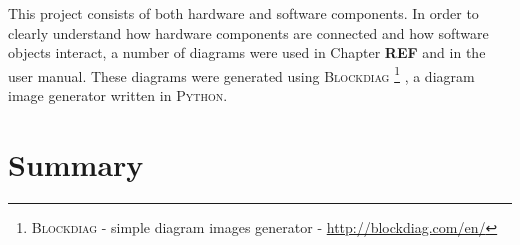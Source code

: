 This project consists of both hardware and software components. In order to clearly understand how hardware components are connected and how software objects interact, a number of diagrams were used in Chapter \textbf{REF} and in the user manual. These diagrams were generated using \textsc{Blockdiag} \footnote{\textsc{Blockdiag} - simple diagram images generator - \url{http://blockdiag.com/en/}} , a diagram image generator written in \textsc{Python}.

\section{Summary}
